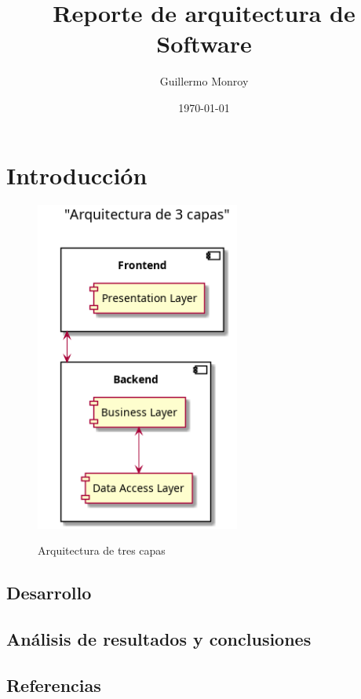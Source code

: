 \documentclass[12pt,letterpaper]{book}
\title{Reporte de arquitectura de Software}
\author{Guillermo Monroy}
\date{\today}
\begin{document}
\maketitle

\chapter{Introducción}
\lipsum
\begin{figure}[H]
    \centering
    \includegraphics[width=0.6\textwidth]{diagrams/3Layers.png}
    \label{fig_3layer}
    \caption{Arquitectura de tres capas}
\end{figure}
\section{Desarrollo}

\section{Análisis de resultados y conclusiones}
\section{Referencias}
\end{document}
